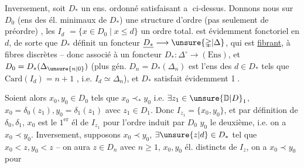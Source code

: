 Inversement, soit $D_{*}$ un ens. ordonné satisfaisant \textcircled{a} ci-dessus. Donnons nous sur $D_0$ (ens des él. minimaux de $D_*$) une structure d'ordre (pas seulement de préordre) , 
  les $I_d$  $=\{x\in D_0\mid x\leq d\}$ un ordre total.   est évidemment fonctoriel 
en $d$, de sorte que $D_*$ définit un foncteur  $\underline{D_*}\longrightarrow\unsure{\mathbb{\Delta}|\Delta}$, qui est \uline{fibrant}, à fibres discrètes -- donc associé à un foncteur $D_*:\mathbb{\Delta}^{\circ}\longrightarrow(\mathrm{Ens})$, et $D_0=D_*(\Delta_{\unsure{n|0}})$
(plus gén. $D_n=D_*(\Delta_n)$ est l'ens des $d\in D_*$ tels que $\mathrm{Card}(I_d)=n+1$ \unsure{$\}$}, i.e. $I_d\simeq\Delta_n$), et $D_*$ satisfait évidemment \textcircled{1}.

Soient alors $x_0,y_0\in D_0$ tels que $x_0\prec_{*}y_0$ i.e. $\exists z_1\in\unsure{\mathbb D|D}_1$, $x_0=\delta_0(z_1),y_0=\delta_1(z_1)$ avec $z_1\in D_1$. Donc $I_{z_1}=\{x_0,y_0\}$, et par définition de $\delta_0,\delta_1$, $x_0$ est
le $\mathrm{1}^{\mathrm{er}}$ él de $I_{z_1}$ pour l'ordre  induit par $D_0$ $y_0$ le deuxième, i.e. on a $x_0\prec y_0$. Inversement,
supposons $x_0\prec y_0$,  $\exists\unsure{z|d}\in D_*$ tel que $x_0<z,y_0<z$ -- on aura $z\in D_n$ avec $n\geq1$, $x_0,y_0$ él. distincts de $I_z$,  on a $x_0\prec y_0$ pour
